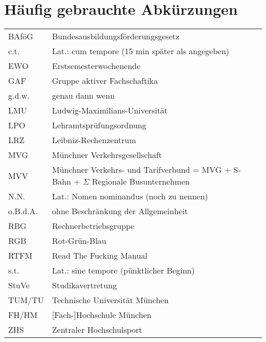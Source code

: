 ﻿
\chapter[Abkürzungen]{Häufig gebrauchte Abkürzungen}
\begin{tabular}{l p{10cm}}
BAföG        &Bundesausbildungsförderungsgesetz\\
c.t.        &Lat.: cum tempore (15 min später als angegeben)\\
EWO        &Erstsemesterwochenende\\
GAF        &Gruppe aktiver Fachschaftika\\
g.d.w.    & genau dann wenn\\
LMU        &Ludwig-Maximilians-Universität\\
LPO        &Lehramtsprüfungsordnung\\
LRZ        &Leibniz-Rechenzentrum\\
MVG    &Münchner Verkehrsgesellschaft\\
MVV    &Münchner Verkehrs- und Tarifverbund = \newline MVG + S-Bahn + $\Sigma$ Regionale Busunternehmen\\
N.N.        &Lat.: Nomen nominandus (noch zu nennen)\\
o.B.d.A.    &ohne Beschränkung der Allgemeinheit\\
RBG        &Rechnerbetriebsgruppe\\
RGB             &Rot-Grün-Blau\\
RTFM        &Read The Fucking Manual\\
s.t.        &Lat.: sine tempore (pünktlicher Beginn)\\
StuVe           &Studikavertretung\\
TUM/TU        &Technische Universität München\\
FH/HM        &[Fach-]Hochschule München\\
ZHS        &Zentraler Hochschulsport\\
\end{tabular}



